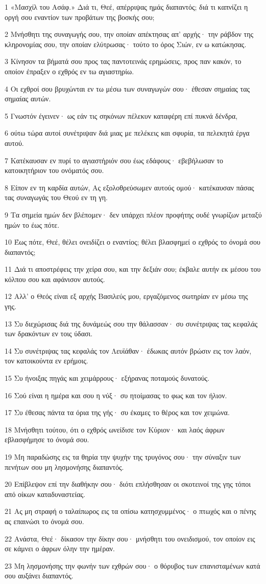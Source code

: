 \par 1 «Μασχίλ του Ασάφ.» Διά τι, Θεέ, απέρριψας ημάς διαπαντός; διά τι καπνίζει η οργή σου εναντίον των προβάτων της βοσκής σου;
\par 2 Μνήσθητι της συναγωγής σου, την οποίαν απέκτησας απ' αρχής· την ράβδον της κληρονομίας σου, την οποίαν ελύτρωσας· τούτο το όρος Σιών, εν ω κατώκησας.
\par 3 Κίνησον τα βήματά σου προς τας παντοτεινάς ερημώσεις, προς παν κακόν, το οποίον έπραξεν ο εχθρός εν τω αγιαστηρίω.
\par 4 Οι εχθροί σου βρυχώνται εν τω μέσω των συναγωγών σου· έθεσαν σημαίας τας σημαίας αυτών.
\par 5 Γνωστόν έγεινεν· ως εάν τις σηκόνων πέλεκυν καταφέρη επί πυκνά δένδρα,
\par 6 ούτω τώρα αυτοί συνέτριψαν διά μιας με πελέκεις και σφυρία, τα πελεκητά έργα αυτού.
\par 7 Κατέκαυσαν εν πυρί το αγιαστήριόν σου έως εδάφους· εβεβήλωσαν το κατοικητήριον του ονόματός σου.
\par 8 Είπον εν τη καρδία αυτών, Ας εξολοθρεύσωμεν αυτούς ομού· κατέκαυσαν πάσας τας συναγωγάς του Θεού εν τη γη.
\par 9 Τα σημεία ημών δεν βλέπομεν· δεν υπάρχει πλέον προφήτης ουδέ γνωρίζων μεταξύ ημών το έως πότε.
\par 10 Έως πότε, Θεέ, θέλει ονειδίζει ο εναντίος; θέλει βλασφημεί ο εχθρός το όνομά σου διαπαντός;
\par 11 Διά τι αποστρέφεις την χείρα σου, και την δεξιάν σου; έκβαλε αυτήν εκ μέσου του κόλπου σου και αφάνισον αυτούς.
\par 12 Αλλ' ο Θεός είναι εξ αρχής Βασιλεύς μου, εργαζόμενος σωτηρίαν εν μέσω της γης.
\par 13 Συ διεχώρισας διά της δυνάμεώς σου την θάλασσαν· συ συνέτριψας τας κεφαλάς των δρακόντων εν τοις ύδασι.
\par 14 Συ συνέτριψας τας κεφαλάς τον Λευϊάθαν· έδωκας αυτόν βρώσιν εις τον λαόν, τον κατοικούντα εν ερήμοις.
\par 15 Συ ήνοιξας πηγάς και χειμάρρους· εξήρανας ποταμούς δυνατούς.
\par 16 Σού είναι η ημέρα και σου η νύξ· συ ητοίμασας το φως και τον ήλιον.
\par 17 Συ έθεσας πάντα τα όρια της γής· συ έκαμες το θέρος και τον χειμώνα.
\par 18 Μνήσθητι τούτου, ότι ο εχθρός ωνείδισε τον Κύριον· και λαός άφρων εβλασφήμησε το όνομά σου.
\par 19 Μη παραδώσης εις τα θηρία την ψυχήν της τρυγόνος σου· την σύναξιν των πενήτων σου μη λησμονήσης διαπαντός.
\par 20 Επίβλεψον επί την διαθήκην σου· διότι επλήσθησαν οι σκοτεινοί της γης τόποι από οίκων καταδυναστείας.
\par 21 Ας μη στραφή ο ταλαίπωρος εις τα οπίσω κατησχυμμένος· ο πτωχός και ο πένης ας επαινώσι το όνομά σου.
\par 22 Ανάστα, Θεέ· δίκασον την δίκην σου· μνήσθητι του ονειδισμού, τον οποίον εις σε κάμνει ο άφρων όλην την ημέραν.
\par 23 Μη λησμονήσης την φωνήν των εχθρών σου· ο θόρυβος των επανισταμένων κατά σου αυξάνει διαπαντός.


